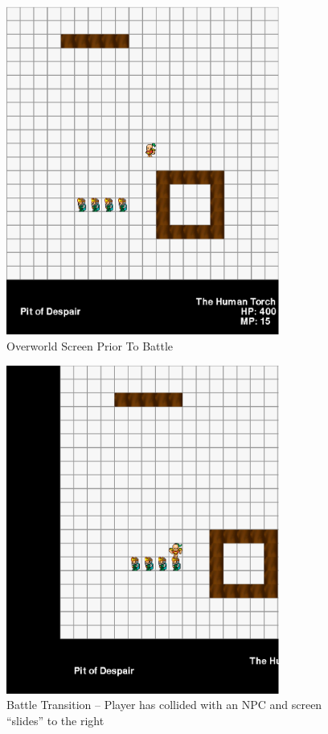\documentclass[11pt]{article}
\begin{document}
\begin{figure}[h!]
\begin{center}
\leavevmode
\includegraphics[width=0.8\textwidth]{images/overworld_before}
\end{center}
\caption{Overworld Screen Prior To Battle}
\end{figure}
\newpage

\begin{figure}[h!]
\begin{center}
\leavevmode
\includegraphics[width=0.8\textwidth]{images/overworld_horizlefttransition}
\end{center}
\caption{Battle Transition -- Player has collided with an NPC and screen ``slides'' to the right}
\end{figure}
\newpage
\end{document}
